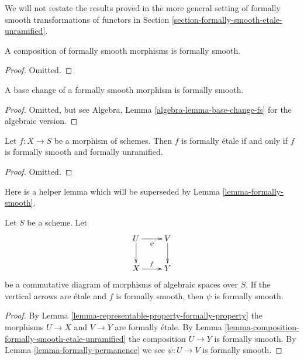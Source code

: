 \medskip\noindent
We will not restate the results proved in the more general setting of
formally smooth transformations of functors in
Section \ref{section-formally-smooth-etale-unramified}.

\begin{lemma}
\label{lemma-composition-formally-smooth}
A composition of formally smooth morphisms is formally smooth.
\end{lemma}

\begin{proof}
Omitted.
\end{proof}

\begin{lemma}
\label{lemma-base-change-formally-smooth}
A base change of a formally smooth morphism is formally smooth.
\end{lemma}

\begin{proof}
Omitted, but see
Algebra, Lemma \ref{algebra-lemma-base-change-fs}
for the algebraic version.
\end{proof}

\begin{lemma}
\label{lemma-formally-etale-unramfied-smooth}
Let $f : X \to S$ be a morphism of schemes.
Then $f$ is formally \'etale if and only if
$f$ is formally smooth and formally unramified.
\end{lemma}

\begin{proof}
Omitted.
\end{proof}

\noindent
Here is a helper lemma which will be superseded by
Lemma \ref{lemma-formally-smooth}.

\begin{lemma}
\label{lemma-helper-formally-smooth}
Let $S$ be a scheme. Let
$$
\xymatrix{
U \ar[d] \ar[r]_\psi & V \ar[d] \\
X \ar[r]^f & Y
}
$$
be a commutative diagram of morphisms of algebraic spaces over $S$.
If the vertical arrows are \'etale and $f$ is formally smooth, then
$\psi$ is formally smooth.
\end{lemma}

\begin{proof}
By
Lemma \ref{lemma-representable-property-formally-property}
the morphisms $U \to X$ and $V \to Y$ are formally \'etale. By
Lemma \ref{lemma-composition-formally-smooth-etale-unramified}
the composition $U \to Y$ is formally smooth. By
Lemma \ref{lemma-formally-permanence}
we see $\psi : U \to V$ is formally smooth.
\end{proof}

